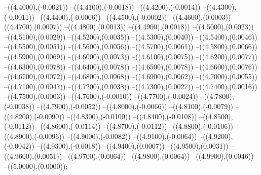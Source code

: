 {	--({\sx*(4.4000)},{\sy*(-0.0021)})
	--({\sx*(4.4100)},{\sy*(-0.0018)})
	--({\sx*(4.4200)},{\sy*(-0.0014)})
	--({\sx*(4.4300)},{\sy*(-0.0011)})
	--({\sx*(4.4400)},{\sy*(-0.0006)})
	--({\sx*(4.4500)},{\sy*(-0.0002)})
	--({\sx*(4.4600)},{\sy*(0.0003)})
	--({\sx*(4.4700)},{\sy*(0.0007)})
	--({\sx*(4.4800)},{\sy*(0.0013)})
	--({\sx*(4.4900)},{\sy*(0.0018)})
	--({\sx*(4.5000)},{\sy*(0.0023)})
	--({\sx*(4.5100)},{\sy*(0.0029)})
	--({\sx*(4.5200)},{\sy*(0.0035)})
	--({\sx*(4.5300)},{\sy*(0.0040)})
	--({\sx*(4.5400)},{\sy*(0.0046)})
	--({\sx*(4.5500)},{\sy*(0.0051)})
	--({\sx*(4.5600)},{\sy*(0.0056)})
	--({\sx*(4.5700)},{\sy*(0.0061)})
	--({\sx*(4.5800)},{\sy*(0.0066)})
	--({\sx*(4.5900)},{\sy*(0.0069)})
	--({\sx*(4.6000)},{\sy*(0.0073)})
	--({\sx*(4.6100)},{\sy*(0.0075)})
	--({\sx*(4.6200)},{\sy*(0.0077)})
	--({\sx*(4.6300)},{\sy*(0.0078)})
	--({\sx*(4.6400)},{\sy*(0.0078)})
	--({\sx*(4.6500)},{\sy*(0.0078)})
	--({\sx*(4.6600)},{\sy*(0.0076)})
	--({\sx*(4.6700)},{\sy*(0.0072)})
	--({\sx*(4.6800)},{\sy*(0.0068)})
	--({\sx*(4.6900)},{\sy*(0.0062)})
	--({\sx*(4.7000)},{\sy*(0.0055)})
	--({\sx*(4.7100)},{\sy*(0.0047)})
	--({\sx*(4.7200)},{\sy*(0.0038)})
	--({\sx*(4.7300)},{\sy*(0.0027)})
	--({\sx*(4.7400)},{\sy*(0.0016)})
	--({\sx*(4.7500)},{\sy*(0.0003)})
	--({\sx*(4.7600)},{\sy*(-0.0010)})
	--({\sx*(4.7700)},{\sy*(-0.0024)})
	--({\sx*(4.7800)},{\sy*(-0.0038)})
	--({\sx*(4.7900)},{\sy*(-0.0052)})
	--({\sx*(4.8000)},{\sy*(-0.0066)})
	--({\sx*(4.8100)},{\sy*(-0.0079)})
	--({\sx*(4.8200)},{\sy*(-0.0090)})
	--({\sx*(4.8300)},{\sy*(-0.0100)})
	--({\sx*(4.8400)},{\sy*(-0.0108)})
	--({\sx*(4.8500)},{\sy*(-0.0112)})
	--({\sx*(4.8600)},{\sy*(-0.0114)})
	--({\sx*(4.8700)},{\sy*(-0.0112)})
	--({\sx*(4.8800)},{\sy*(-0.0106)})
	--({\sx*(4.8900)},{\sy*(-0.0096)})
	--({\sx*(4.9000)},{\sy*(-0.0082)})
	--({\sx*(4.9100)},{\sy*(-0.0064)})
	--({\sx*(4.9200)},{\sy*(-0.0042)})
	--({\sx*(4.9300)},{\sy*(-0.0018)})
	--({\sx*(4.9400)},{\sy*(0.0007)})
	--({\sx*(4.9500)},{\sy*(0.0031)})
	--({\sx*(4.9600)},{\sy*(0.0051)})
	--({\sx*(4.9700)},{\sy*(0.0064)})
	--({\sx*(4.9800)},{\sy*(0.0064)})
	--({\sx*(4.9900)},{\sy*(0.0046)})
	--({\sx*(5.0000)},{\sy*(0.0000)});
}
